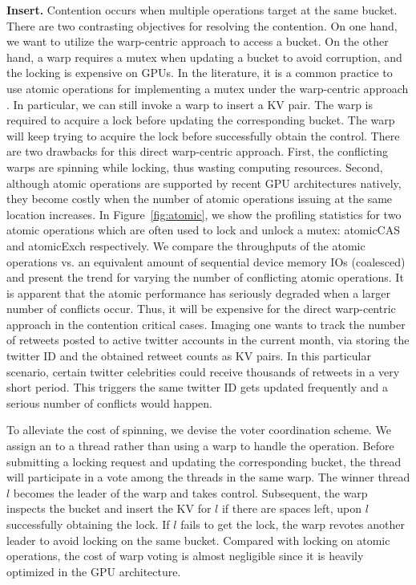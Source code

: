 \vspace{1mm}\noindent\textbf{Insert.} Contention occurs when multiple  operations target at the same bucket. 
There are two contrasting objectives for resolving the contention. On one hand, we want to utilize the warp-centric approach to access a bucket.
On the other hand, a warp requires a mutex when updating a bucket to avoid corruption, and the locking is expensive on GPUs.  
In the literature, it is a common practice to use atomic operations for implementing a mutex under the warp-centric approach \cite{zhang2015mega}. 
In particular, we can still invoke a warp to insert a KV pair. The warp is required to acquire a lock before updating the corresponding bucket. 
The warp will keep trying to acquire the lock before successfully obtain the control. 
There are two drawbacks for this direct warp-centric approach. 
First, the conflicting warps are spinning while locking, thus wasting computing resources.
Second, although atomic operations are supported by recent GPU architectures natively, 
they become costly when the number of atomic operations issuing at the same location increases. 
In Figure~\ref{fig:atomic}, we show the profiling statistics for two atomic operations which are often used to lock and unlock a mutex: atomicCAS and atomicExch respectively. 
We compare the throughputs of the atomic operations vs. an equivalent amount of sequential device memory IOs (coalesced) and present the trend for varying the number of conflicting atomic operations. It is apparent that the atomic performance has seriously degraded when a larger number of conflicts occur. 
Thus, it will be expensive for the direct warp-centric approach in the contention critical cases. 
Imaging one wants to track the number of retweets posted to active twitter accounts in the current month, via storing the twitter ID and the obtained retweet counts as KV pairs. In this particular scenario, certain twitter celebrities could receive thousands of retweets in a very short period. 
This triggers the same twitter ID gets updated frequently and a serious number of conflicts would happen. 




To alleviate the cost of spinning, we devise the voter coordination scheme. 
We assign an  to a thread rather than using a warp to handle the operation. Before submitting a locking request and updating the corresponding bucket, the thread will participate in a vote among the threads in the same warp. 
The winner thread $l$ becomes the leader of the warp and takes control. Subsequent, the warp inspects the bucket and insert the KV for $l$ if there are spaces left, upon $l$ successfully obtaining the lock.
If $l$ fails to get the lock, the warp revotes another leader to avoid locking on the same bucket.
Compared with locking on atomic operations, the cost of warp voting is almost negligible since it is heavily optimized in the GPU architecture.  


